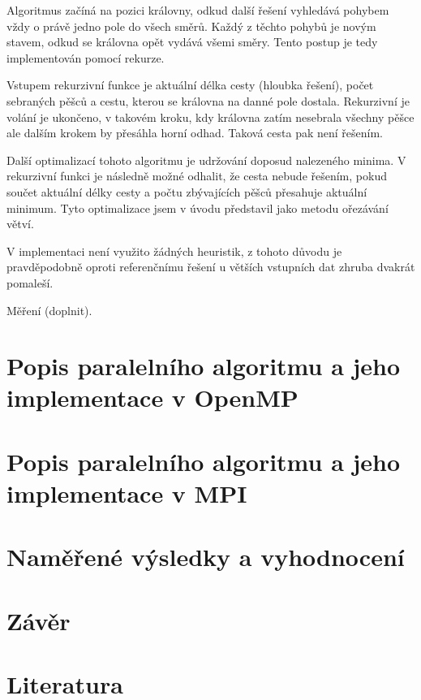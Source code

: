 \documentclass[czech]{article}
\begin{document}
Algoritmus začíná na pozici královny, odkud další řešení vyhledává pohybem vždy o právě jedno pole do všech směrů.
Každý z těchto pohybů je novým stavem, odkud se královna opět vydává všemi směry.
Tento postup je tedy implementován pomocí rekurze.

Vstupem rekurzivní funkce je aktuální délka cesty (hloubka řešení), počet sebraných pěšců a cestu, kterou se královna na danné pole dostala.
Rekurzivní je volání je ukončeno, v takovém kroku, kdy královna zatím nesebrala všechny pěšce ale dalším krokem by přesáhla horní odhad.
Taková cesta pak není řešením.

Další optimalizací tohoto algoritmu je udržování doposud nalezeného minima.
V rekurzivní funkci je následně možné odhalit, že cesta nebude řešením, pokud součet aktuální délky cesty a počtu zbývajících pěšců přesahuje aktuální minimum.
Tyto optimalizace jsem v úvodu představil jako metodu ořezávání větví.

V implementaci není využito žádných heuristik, z tohoto důvodu je pravděpodobně oproti referenčnímu řešení u větších vstupních dat zhruba dvakrát pomaleší.

Měření (doplnit).

\section{Popis paralelního algoritmu a jeho implementace v OpenMP}

\section{Popis paralelního algoritmu a jeho implementace v MPI}

\section{Naměřené výsledky a vyhodnocení}

\section{Závěr}

\section{Literatura}

\appendix
\end{document}
